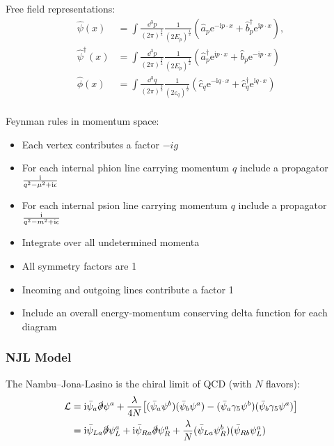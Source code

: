 			\noindent
			Free field representations:
			\begin{equation}
				\begin{aligned}
					\hat{\psi}(x) &= \int\frac{\dd^{3}p}{\left(2\pi\right)^{\frac{3}{2}}}\frac{1}{(2E_{p})^{\frac{1}{2}}}\left(\hat{a}_{p}\mathrm{e}^{-\mathrm{i}p\cdot x}+\hat{b}_{p}^{\dagger}\mathrm{e}^{\mathrm{i}p\cdot x}\right), \\
					\hat{\psi}^{\dagger}(x) &= \int\frac{\dd^{3}p}{(2\pi)^{\frac{3}{2}}}\frac{1}{(2E_{p})^{\frac{1}{2}}}\left(\hat{a}_{p}^{\dagger}\mathrm{e}^{\mathrm{i}p\cdot x}+\hat{b}_{p}\mathrm{e}^{-\mathrm{i}p\cdot x}\right) \\
					\hat{\phi}(x) &=\int\frac{\dd^{3}q}{\left(2\pi\right)^{\frac{3}{2}}}\frac{1}{\left(2\varepsilon_{q}\right)^{\frac{1}{2}}}\left(\hat{c}_{q}\mathrm{e}^{-\mathrm{i}q\cdot x}+\hat{c}_{q}^{\dagger}\mathrm{e}^{\mathrm{i}q\cdot x}\right) \\
				\end{aligned}
			\end{equation}

			\noindent
			Feynman rules in momentum space:
			\begin{itemize}\itemsep -0pt
				\item Each vertex contributes a factor $-ig$
				\item For each internal phion line carrying momentum $q$ include a propagator $\frac{\mathrm{i}}{q^2 -\mu^2+\mathrm{i}\epsilon}$
				\item For each internal psion line carrying momentum $q$ include a
					propagator $\frac{\mathrm{i}}{q^2 -m^2+\mathrm{i}\epsilon}$
				\item Integrate over all undetermined momenta
				\item All symmetry factors are 1
				\item Incoming and outgoing lines contribute a factor 1
				\item Include an overall energy-momentum conserving delta function
					for each diagram
			\end{itemize}



		\subsubsection{NJL Model}
			The Nambu--Jona-Lasino is the chiral limit of QCD (with $N$ flavors):
			\begin{equation}
				\begin{aligned}
					\mathcal{L}
					&= \mathrm{i} \bar{\psi}_a \slashed{\partial} \psi^a + \frac{\lambda}{4 N} \qty[(\bar{\psi}_a\psi^b)(\bar{\psi}_b\psi^a) - (\bar{\psi}_a\gamma_5 \psi^b) (\bar{\psi}_b\gamma_5 \psi^a)] \\
					&= \mathrm{i} \bar{\psi}_{La} \slashed{\partial} \psi_L^a + \mathrm{i} \bar{\psi}_{Ra} \slashed{\partial} \psi_R^a + \frac{\lambda}{N} (\bar{\psi}_{La}\psi_R^b)(\bar{\psi}_{Rb}\psi_L^a)
				\end{aligned}
			\end{equation}

